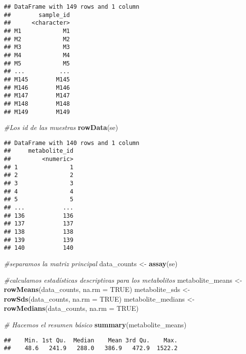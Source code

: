 \documentclass[
]{article}
\newenvironment{Shaded}{\begin{snugshade}}{\end{snugshade}}
\newcommand{\AttributeTok}[1]{\textcolor[rgb]{0.13,0.29,0.53}{#1}}
\newcommand{\CommentTok}[1]{\textcolor[rgb]{0.56,0.35,0.01}{\textit{#1}}}
\newcommand{\ConstantTok}[1]{\textcolor[rgb]{0.56,0.35,0.01}{#1}}
\newcommand{\FunctionTok}[1]{\textcolor[rgb]{0.13,0.29,0.53}{\textbf{#1}}}
\newcommand{\NormalTok}[1]{#1}
\newcommand{\OtherTok}[1]{\textcolor[rgb]{0.56,0.35,0.01}{#1}}
\begin{document}
\begin{verbatim}
## DataFrame with 149 rows and 1 column
##        sample_id
##      <character>
## M1            M1
## M2            M2
## M3            M3
## M4            M4
## M5            M5
## ...          ...
## M145        M145
## M146        M146
## M147        M147
## M148        M148
## M149        M149
\end{verbatim}

\begin{Shaded}
\begin{Highlighting}[]
\CommentTok{\#Los id de las muestras}
\FunctionTok{rowData}\NormalTok{(se)}
\end{Highlighting}
\end{Shaded}

\begin{verbatim}
## DataFrame with 140 rows and 1 column
##     metabolite_id
##         <numeric>
## 1               1
## 2               2
## 3               3
## 4               4
## 5               5
## ...           ...
## 136           136
## 137           137
## 138           138
## 139           139
## 140           140
\end{verbatim}

\begin{Shaded}
\begin{Highlighting}[]
\CommentTok{\#separamos la matriz principal}
\NormalTok{data\_counts }\OtherTok{\textless{}{-}} \FunctionTok{assay}\NormalTok{(se)}

\CommentTok{\#calculamos estadísticas descriptivas para los metabolitos}
\NormalTok{metabolite\_means }\OtherTok{\textless{}{-}} \FunctionTok{rowMeans}\NormalTok{(data\_counts, }\AttributeTok{na.rm =} \ConstantTok{TRUE}\NormalTok{)}
\NormalTok{metabolite\_sds }\OtherTok{\textless{}{-}} \FunctionTok{rowSds}\NormalTok{(data\_counts, }\AttributeTok{na.rm =} \ConstantTok{TRUE}\NormalTok{)}
\NormalTok{metabolite\_medians }\OtherTok{\textless{}{-}} \FunctionTok{rowMedians}\NormalTok{(data\_counts, }\AttributeTok{na.rm =} \ConstantTok{TRUE}\NormalTok{)}

\CommentTok{\# Hacemos el resumen básico}
\FunctionTok{summary}\NormalTok{(metabolite\_means)}
\end{Highlighting}
\end{Shaded}

\begin{verbatim}
##    Min. 1st Qu.  Median    Mean 3rd Qu.    Max. 
##    48.6   241.9   288.0   386.9   472.9  1522.2
\end{verbatim}
\end{document}
